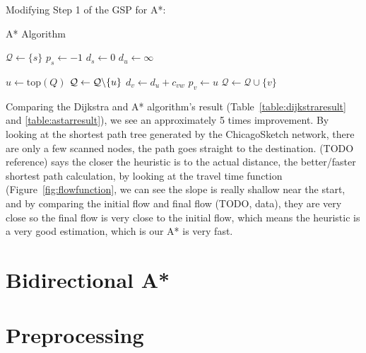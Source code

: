 Modifying Step 1 of the GSP for A*:
\begin{algorithm}
    \caption{A* Algorithm}
    \begin{algorithmic}[1]
        \State $\mathcal{Q} \gets \{s\}$ 
        \State $p_s \gets -1$
        \State $d_s \gets 0$
         
            \State $d_u \gets \infty$
        \EndFor

        \State $ u \gets \text{top}(Q) $ 
            \State $ \mathcal{Q} \gets \mathcal{Q} \char`\\ \{u\} $
                \State {}
            \EndIf
             
                        \State $d_v \gets d_u + c_{vw}$
                        \State $p_v \gets u$
                        \State $\mathcal{Q} \gets \mathcal{Q} \cup \{v\}$ 
                    \EndIf
                \EndFor
            \EndIf
        \EndWhile
        \EndProcedure
    \end{algorithmic}
\end{algorithm}


Comparing the Dijkstra and A* algorithm's result (Table~\ref{table:dijkstraresult} and \ref{table:astarresult}),
we see an approximately 5 times improvement.
By looking at the shortest path tree generated
by the ChicagoSketch network,
there are only a few scanned nodes,
the path goes straight to the destination.
(TODO reference) says the closer the heuristic is to the actual
distance,
the better/faster shortest path calculation,
by looking at the travel time function (Figure~\ref{fig:flowfunction}, we can see the slope
is really shallow near the start,
and by comparing the initial flow and final flow (TODO, data),
they are very close so the final flow is very close to the
initial flow,
which means the heuristic is a very good estimation,
which is our A* is very fast.

\section{Bidirectional A*}
\section{Preprocessing}
